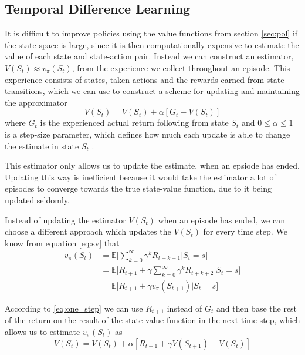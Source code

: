 \documentclass[11pt]{article}
\begin{document}
\maketitle

\subsection{Temporal Difference Learning}\label{sec:td}

It is difficult to improve policies using the value functions from
section \ref{sec:pol} if the state space is large, since it is then
computationally expensive to estimate the value of each state and
state-action pair.
Instead we can construct an estimator, $V(S_{t}) \approx v_\pi(S_t)$,
from the experience we collect throughout an episode.
This experience consists of states, taken actions and the rewards
earned from state transitions, which we can use to construct
a scheme for updating and maintaining the approximator
\begin{equation}
    V(S_t) = V(S_t) + \alpha [G_t - V(S_t)]
\end{equation}
where $G_t$ is the experienced actual return following from state
$S_t$ and $0 \leq \alpha \leq 1$ is a step-size parameter, 
which defines how much each update is able to change the estimate
in state $S_t$ \cite{RLbook}.

This estimator only allows us to update the estimate, when an epsiode
has ended.
Updating this way is inefficient because it would take the estimator
a lot of episodes to converge towards the true state-value function,
due to it being updated seldomly. 

Instead of updating the estimator $V(S_t)$ when an episode has
ended, we can choose a different approach which updates the $V(S_t)$
for every time step.
We know from equation \ref{eq:sv} that
\begin{equation}\label{eq:one_step}
    \begin{aligned}
        v_\pi(S_t) & = \mathds{E}\bigg[\sum\limits_{k=0}^\infty \gamma^k  R_{t+k+1} \bigg| S_t = s\bigg] \\
                   & = \mathds{E}\bigg[R_{t+1} + \gamma  \sum\limits_{k=0}^\infty \gamma^k  R_{t+k+2} \bigg| S_t = s\bigg] \\
                   & = \mathds{E}\bigg[R_{t+1} + \gamma  v_\pi(S_{t+1}) \bigg| S_t = s\bigg]
    \end{aligned}
\end{equation}

According to \ref{eq:one_step} we can use $R_{t+1}$ instead of $G_t$
and then base the rest of the return on the result of the state-value
function in the next time step, which allows us to estimate $v_\pi(S_t)$ as
\begin{equation}
    V(S_t) = V(S_t) + \alpha  [R_{t+1} + \gamma  V(S_{t+1}) - V(S_t)]
\end{equation}
\end{document}
